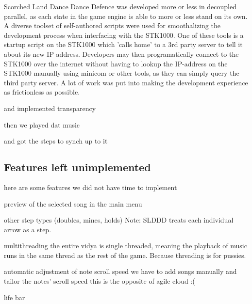 Scorched Land Dance Dance Defence was developed more or less in decoupled parallel, as each state in the game engine is able to more or less stand on its own.
A diverse toolset of self-authored scripts were used for smoothalizing the development process when interfacing with the STK1000.
One of these tools is a startup script on the STK1000 which 'calls home' to a 3rd party server to tell it about its new IP address.
Developers may then programatically connect to the STK1000 over the internet without having to lookup the IP-address on the STK1000 manually using minicom or other tools, as they can simply query the third party server.
A lot of work was put into making the development experience as frictionless as possible.



and implemented transparency

then we played dat music

and got the steps to synch up to it

\subsection{Features left unimplemented}
	here are some features we did not have time to implement


	preview of the selected song in the main menu

	other step types (doubles, mines, holds)
		Note: SLDDD treats each individual arrow as a step. 

	multithreading
		the entire vidya is single threaded, meaning the playback of music runs in the same thread as the rest of the game. Because threading is for pussies.

	automatic adjustment of note scroll speed
		we have to add songs manually and tailor the notes' scroll speed
		this is the opposite of agile cloud :(

	life bar
